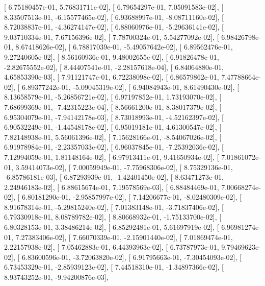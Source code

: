 \documentclass{article}
\begin{document}
       [  6.75180457e-01,   5.76831711e-02],
       [  6.79654297e-01,   7.05091583e-02],
       [  8.33507513e-01,  -6.15577465e-02],
       [  6.93688997e-01,  -8.08711160e-02],
       [  8.72038837e-01,  -4.36274147e-02],
       [  6.88060976e-01,  -5.29636141e-02],
       [  9.03710334e-01,   7.67156396e-02],
       [  7.78700324e-01,   5.54277092e-02],
       [  6.98426798e-01,   8.67418626e-02],
       [  6.78817039e-01,  -5.49057642e-02],
       [  6.89562476e-01,   9.27240605e-02],
       [  8.56160936e-01,   9.48002655e-02],
       [  6.91826478e-01,  -2.82675552e-02],
       [  8.44407541e-01,  -2.28157618e-04],
       [  6.84064880e-01,   4.65853390e-03],
       [  7.91121747e-01,   6.72238098e-02],
       [  6.86579862e-01,   7.47788664e-02],
       [  6.89377242e-01,  -5.09045319e-02],
       [  6.94084943e-01,   8.61490430e-02],
       [  8.13658579e-01,  -5.26856721e-02],
       [  6.97197852e-01,   1.73193070e-02],
       [  7.68699369e-01,  -7.42315223e-04],
       [  8.56661200e-01,   8.38017379e-02],
       [  6.95304079e-01,  -7.94142178e-03],
       [  8.73018993e-01,  -4.52162397e-02],
       [  6.90532249e-01,  -1.44548178e-02],
       [  6.95019181e-01,   4.61300547e-02],
       [  7.82148938e-01,   5.56061396e-02],
       [  7.15628166e-01,  -8.54067026e-02],
       [  6.91978984e-01,  -2.23357033e-02],
       [  6.96037845e-01,  -7.25392036e-02],
       [  7.12994059e-01,   1.81148164e-02],
       [  6.97913411e-01,   9.41650934e-02],
       [  7.01861072e-01,   3.59414073e-02],
       [  7.00059949e-01,  -7.75968306e-02],
       [  8.75329136e-01,  -6.85786181e-03],
       [  6.87293939e-01,  -1.42401450e-02],
       [  8.63471273e-01,   2.24946183e-02],
       [  6.88615674e-01,   7.19578569e-03],
       [  6.88484469e-01,   7.00668274e-02],
       [  6.80181290e-01,  -2.95857997e-02],
       [  7.14206677e-01,  -8.02480309e-02],
       [  8.91678314e-01,  -5.29815240e-02],
       [  7.01383148e-01,  -3.71837406e-02],
       [  6.79330918e-01,   8.08789782e-02],
       [  8.80668932e-01,  -1.75133700e-02],
       [  6.80328153e-01,   3.38486214e-02],
       [  6.85292481e-01,   5.61697919e-02],
       [  6.96981274e-01,   7.27383406e-02],
       [  7.66070339e-01,  -2.15901440e-02],
       [  7.01869474e-01,   2.22157938e-02],
       [  7.05462883e-01,   6.44393963e-02],
       [  6.73787973e-01,   9.79469623e-02],
       [  6.83600596e-01,  -3.72063820e-02],
       [  6.91795663e-01,  -7.30454093e-02],
       [  6.73453329e-01,  -2.85939123e-02],
       [  7.44518310e-01,  -1.34897366e-02],
       [  8.93743252e-01,  -9.94200876e-03],
\end{document}
